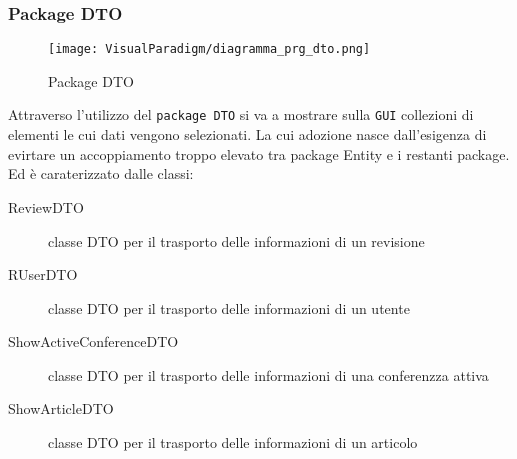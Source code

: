 \subsubsection{Package DTO}

\label{sec:package_dto_prg_image}
\begin{figure}[ht]
  \centering
  \texttt{[image: VisualParadigm/diagramma\_prg\_dto.png]}
  \caption{Package DTO}
  \label{fig:Package DTO}
\end{figure}

Attraverso l'utilizzo del \texttt{package DTO} si va a mostrare sulla \texttt{GUI} collezioni di elementi le cui dati vengono selezionati. La cui adozione nasce dall'esigenza di evirtare un accoppiamento troppo elevato tra package Entity e i restanti package. Ed è caraterizzato dalle classi:
\begin{description}
\item[ReviewDTO] classe DTO per il trasporto delle informazioni di un revisione
\item[RUserDTO] classe DTO per il trasporto delle informazioni di un utente
\item[ShowActiveConferenceDTO] classe DTO per il trasporto delle informazioni di una conferenzza attiva
\item[ShowArticleDTO] classe DTO per il trasporto delle informazioni di un articolo
\end{description}

